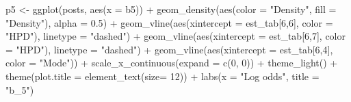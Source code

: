 \documentclass[12pt]{article}
\newenvironment{Shaded}{\begin{snugshade}}{\end{snugshade}}
\newcommand{\AttributeTok}[1]{\textcolor[rgb]{0.77,0.63,0.00}{#1}}
\newcommand{\DecValTok}[1]{\textcolor[rgb]{0.00,0.00,0.81}{#1}}
\newcommand{\FloatTok}[1]{\textcolor[rgb]{0.00,0.00,0.81}{#1}}
\newcommand{\FunctionTok}[1]{\textcolor[rgb]{0.00,0.00,0.00}{#1}}
\newcommand{\NormalTok}[1]{#1}
\newcommand{\OtherTok}[1]{\textcolor[rgb]{0.56,0.35,0.01}{#1}}
\newcommand{\SpecialCharTok}[1]{\textcolor[rgb]{0.00,0.00,0.00}{#1}}
\newcommand{\StringTok}[1]{\textcolor[rgb]{0.31,0.60,0.02}{#1}}
\begin{document}
\begin{Shaded}
\begin{Highlighting}[]
\NormalTok{p5 }\OtherTok{\textless{}{-}} \FunctionTok{ggplot}\NormalTok{(posts, }\FunctionTok{aes}\NormalTok{(}\AttributeTok{x =}\NormalTok{ b5)) }\SpecialCharTok{+}
  \FunctionTok{geom\_density}\NormalTok{(}\FunctionTok{aes}\NormalTok{(}\AttributeTok{color =} \StringTok{"Density"}\NormalTok{, }\AttributeTok{fill =} \StringTok{"Density"}\NormalTok{), }\AttributeTok{alpha =} \FloatTok{0.5}\NormalTok{) }\SpecialCharTok{+}
  \FunctionTok{geom\_vline}\NormalTok{(}\FunctionTok{aes}\NormalTok{(}\AttributeTok{xintercept =}\NormalTok{ est\_tab[}\DecValTok{6}\NormalTok{,}\DecValTok{6}\NormalTok{], }\AttributeTok{color =} \StringTok{"HPD"}\NormalTok{), }\AttributeTok{linetype =} \StringTok{"dashed"}\NormalTok{) }\SpecialCharTok{+}
  \FunctionTok{geom\_vline}\NormalTok{(}\FunctionTok{aes}\NormalTok{(}\AttributeTok{xintercept =}\NormalTok{ est\_tab[}\DecValTok{6}\NormalTok{,}\DecValTok{7}\NormalTok{], }\AttributeTok{color =} \StringTok{"HPD"}\NormalTok{), }\AttributeTok{linetype =} \StringTok{"dashed"}\NormalTok{) }\SpecialCharTok{+}
  \FunctionTok{geom\_vline}\NormalTok{(}\FunctionTok{aes}\NormalTok{(}\AttributeTok{xintercept =}\NormalTok{ est\_tab[}\DecValTok{6}\NormalTok{,}\DecValTok{4}\NormalTok{], }\AttributeTok{color =} \StringTok{"Mode"}\NormalTok{)) }\SpecialCharTok{+}
  \FunctionTok{scale\_x\_continuous}\NormalTok{(}\AttributeTok{expand =} \FunctionTok{c}\NormalTok{(}\DecValTok{0}\NormalTok{, }\DecValTok{0}\NormalTok{)) }\SpecialCharTok{+}
  \FunctionTok{theme\_light}\NormalTok{() }\SpecialCharTok{+}
  \FunctionTok{theme}\NormalTok{(}\AttributeTok{plot.title =} \FunctionTok{element\_text}\NormalTok{(}\AttributeTok{size=} \DecValTok{12}\NormalTok{)) }\SpecialCharTok{+} 
  \FunctionTok{labs}\NormalTok{(}\AttributeTok{x =} \StringTok{"Log odds"}\NormalTok{,}
       \AttributeTok{title =} \StringTok{"b\_5"}\NormalTok{)}


\end{Highlighting}
\end{Shaded}
\end{document}
